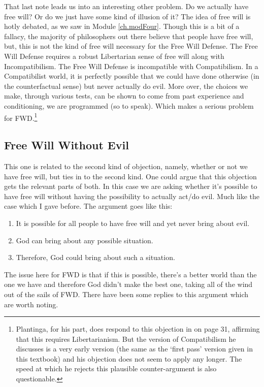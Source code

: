 That last note leads us into an interesting other problem. Do we actually have free will? Or do we just have some kind of illusion of it? The idea of free will is hotly debated, as we saw in Module \ref{ch.modFour}. Though this is a bit of a fallacy, the majority of philosophers out there believe that people have free will, but, this is not the kind of free will necessary for the Free Will Defense. The Free Will Defense requires a robust Libertarian sense of free will along with Incompatibilism. The Free Will Defense is incompatible with Compatibilism. In a Compatibilist world, it is perfectly possible that we could have done otherwise (in the counterfactual sense) but never actually do evil. More over, the choices we make, through various tests, can be shown to come from past experience and conditioning, we are programmed (so to speak). Which makes a serious problem for FWD.\footnote{Plantinga, for his part, does respond to this objection in  on page 31, affirming that this requires Libertarianism. But the version of Compatibilism he discusses is a very early version (the same as the `first pass' version given in this textbook) and his objection does not seem to apply any longer. The speed at which he rejects this plausible counter-argument is also questionable.}  

\subsection{Free Will Without Evil}

This one is related to the second kind of objection, namely, whether or not we have free will, but ties in to the second kind. One could argue that this objection gets the relevant parts of both. In this case we are asking whether it's possible to have free will without having the possibility to actually act/do evil. Much like the case which I gave before. The argument goes like this:

\begin{enumerate}
   \item It is possible for all people to have free will and yet never bring about evil.
    \item God can bring about any possible situation.
    \item Therefore, God could bring about such a situation.
\end{enumerate}

The issue here for FWD is that if this is possible, there's a better world than the one we have and therefore God didn't make the best one, taking all of the wind out of the sails of FWD.  There have been some replies to this argument which are worth noting.

